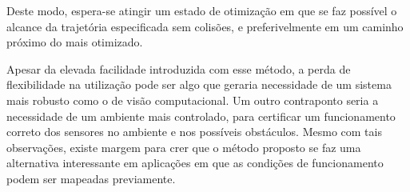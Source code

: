 Deste modo, espera-se atingir um estado de otimização em que se faz
possível o alcance da trajetória especificada sem colisões, e preferivelmente em
um caminho próximo do mais otimizado.

Apesar da elevada facilidade introduzida com esse método, a perda de
flexibilidade na utilização pode ser algo que geraria necessidade de um sistema
mais robusto como o de visão computacional. Um outro contraponto seria a
necessidade de um ambiente mais controlado, para certificar um funcionamento
correto dos sensores no ambiente e nos possíveis obstáculos. Mesmo com tais
observações, existe margem para crer que o método proposto se faz uma
alternativa interessante em aplicações em que as condições de funcionamento
podem ser mapeadas previamente.
